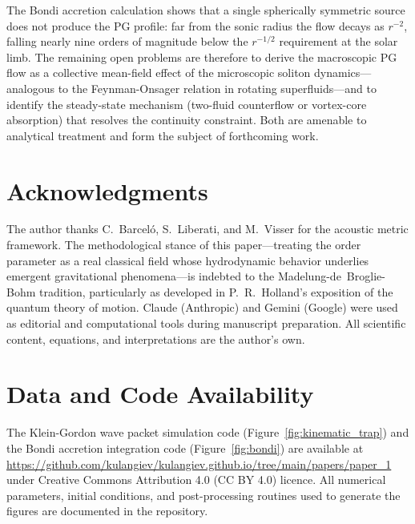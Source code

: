 \documentclass[12pt, a4paper]{article}
\begin{document}
The Bondi accretion calculation shows that a single spherically symmetric source does not produce the PG profile: far from the sonic radius the flow decays as $r^{-2}$, falling nearly nine orders of magnitude below the $r^{-1/2}$ requirement at the solar limb. The remaining open problems are therefore to derive the macroscopic PG flow as a collective mean-field effect of the microscopic soliton dynamics---analogous to the Feynman-Onsager relation in rotating superfluids---and to identify the steady-state mechanism (two-fluid counterflow or vortex-core absorption) that resolves the continuity constraint. Both are amenable to analytical treatment and form the subject of forthcoming work.

\section*{Acknowledgments}

The author thanks C.~Barcel\'{o}, S.~Liberati, and M.~Visser for the acoustic metric framework. The methodological stance of this paper---treating the order parameter as a real classical field whose hydrodynamic behavior underlies emergent gravitational phenomena---is indebted to the Madelung-de~Broglie-Bohm tradition, particularly as developed in P.~R.~Holland's exposition of the quantum theory of motion. Claude (Anthropic) and Gemini (Google) were used as editorial and computational tools during manuscript preparation. All scientific content, equations, and interpretations are the author's own.

\section*{Data and Code Availability}

The Klein-Gordon wave packet simulation code (Figure~\ref{fig:kinematic_trap}) and the Bondi accretion integration code (Figure~\ref{fig:bondi}) are available at \url{https://github.com/kulangiev/kulangiev.github.io/tree/main/papers/paper_1} under Creative Commons Attribution 4.0 (CC BY 4.0) licence. All numerical parameters, initial conditions, and post-processing routines used to generate the figures are documented in the repository.
\end{document}
